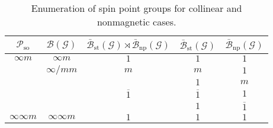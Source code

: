 \begin{table}[tb]
  \centering
  \caption{
    Enumeration of spin point groups for collinear and nonmagnetic cases.
  }
  \label{tab:spin_point_group_collinear_nonmagnetic}
  \begin{tabular}{ccccc}
    \hline \hline
    $\mathcal{P}_{\mathrm{so}}$  %
        & $\mathcal{B}(\mathcal{G})$
        & $\bar{\mathcal{B}}_{\mathrm{st}}(\mathcal{G}) \rtimes \bar{\mathcal{B}}_{\mathrm{np}}(\mathcal{G})$  %
        & $\bar{\mathcal{B}}_{\mathrm{st}}(\mathcal{G})$  %
        & $\bar{\mathcal{B}}_{\mathrm{np}}(\mathcal{G})$  %
        \\
    \hline
    $\infty m$ & $\infty m$     & $1$            & $1$            & $1$ \\
               & $\infty / m m$ & $m$            & $m$            & $1$ \\
               &                &                & $1$            & $m$ \\
               &                & $\overline{1}$ & $\overline{1}$ & $1$ \\
               &                &                & $1$            & $\overline{1}$ \\
    \hline
    $\infty \infty m$ & $\infty \infty m$ & $1$ & $1$ & $1$ \\
    \hline \hline
  \end{tabular}
\end{table}
